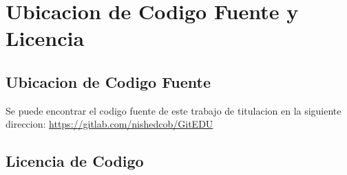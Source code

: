 
\chapter{Ubicacion de Codigo Fuente y Licencia}

\label{AnexoI} 

\section{Ubicacion de Codigo Fuente}
Se puede encontrar el codigo fuente de este trabajo de titulacion en la siguiente direccion: \url{https://gitlab.com/nishedcob/GitEDU}

\section{Licencia de Codigo}
